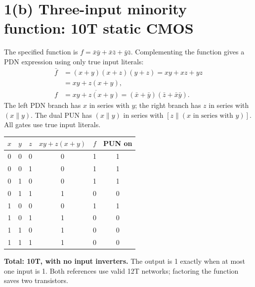 \documentclass[11pt,a4paper]{article}
\newcommand{\answer}[1]{\par\noindent\colorbox{accent!9}{\parbox{0.96\linewidth}{#1}}\par}
\newcommand{\VDD}{V_{\mathrm{DD}}}
\newcommand{\VSS}{V_{\mathrm{SS}}}
\newcommand{\MOS}[5]{
  \coordinate (#1) at (#2,#3);
  \coordinate (#1t) at ($(#1)+(0,.55)$);
  \coordinate (#1b) at ($(#1)+(0,-.55)$);
  \draw (#1t)--($(#1)+(0,.30)$)--($(#1)+(-.18,.30)$);
  \draw ($(#1)+(-.18,.34)$)--($(#1)+(-.18,-.34)$);
  \draw ($(#1)+(-.18,-.30)$)--($(#1)+(0,-.30)$)--(#1b);
  \draw ($(#1)+(-.35,.33)$)--($(#1)+(-.35,-.33)$);
  \def\type{#5}\def\ptype{p}
  \ifx\type\ptype
    \draw ($(#1)+(-.78,0)$)--($(#1)+(-.53,0)$);
    \draw ($(#1)+(-.465,0)$) circle (.065);
    \draw ($(#1)+(-.40,0)$)--($(#1)+(-.35,0)$);
  \else
    \draw ($(#1)+(-.78,0)$)--($(#1)+(-.35,0)$);
  \fi
  \node[anchor=east] at ($(#1)+(-.82,0)$) {$#4$};
  \node[anchor=west,font=\scriptsize] at ($(#1)+(.10,0)$) {#1};
}
\begin{document}
\newpage
\section*{1(b) Three-input minority function: 10T static CMOS}
The specified function is $f=\bar x\bar y+\bar x\bar z+\bar y\bar z$.
Complementing the function gives a PDN expression using only true input literals:
\begin{align*}
 \bar f&=(x+y)(x+z)(y+z)=xy+xz+yz\\
 &=xy+z(x+y),\\
 f&=\overline{xy+z(x+y)}
   =(\bar x+\bar y)(\bar z+\bar x\bar y).
\end{align*}
The left PDN branch has $x$ in series with $y$; the right branch has $z$ in series
with $(x\parallel y)$. The dual PUN has $(x\parallel y)$ in series with
$[z\parallel(x\text{ in series with }y)]$. All gates use true input literals.
\begin{center}
\end{center}
\begin{center}
\begin{tabular}{cccccc}\toprule
$x$&$y$&$z$&$xy+z(x+y)$&$f$&PUN on\\\midrule
0&0&0&0&1&1\\0&0&1&0&1&1\\0&1&0&0&1&1\\0&1&1&1&0&0\\
1&0&0&0&1&1\\1&0&1&1&0&0\\1&1&0&1&0&0\\1&1&1&1&0&0\\\bottomrule
\end{tabular}
\end{center}
\answer{\textbf{Total: 10T, with no input inverters.} The output is 1 exactly when
at most one input is 1. Both references use valid 12T networks; factoring the
function saves two transistors.}
\end{document}
